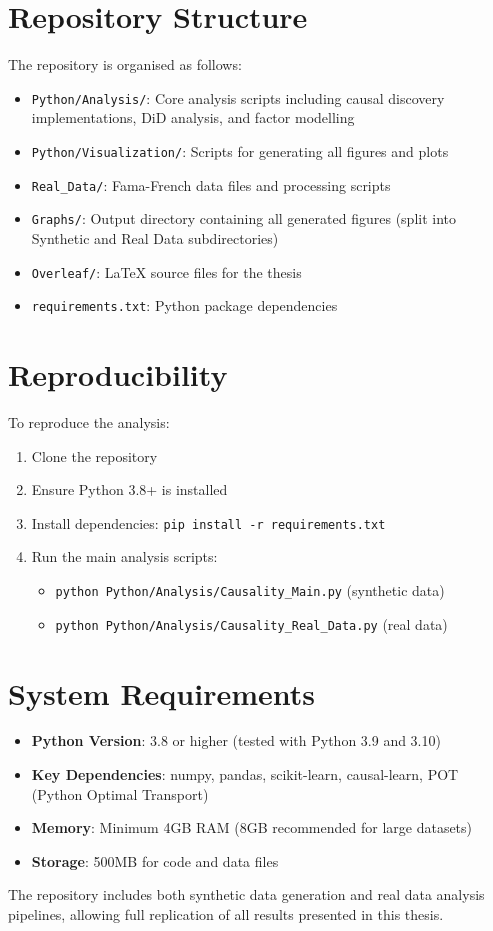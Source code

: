 \section*{Repository Structure}
The repository is organised as follows:
\begin{itemize}
    \item \texttt{Python/Analysis/}: Core analysis scripts including causal discovery implementations, DiD analysis, and factor modelling
    \item \texttt{Python/Visualization/}: Scripts for generating all figures and plots
    \item \texttt{Real\_Data/}: Fama-French data files and processing scripts
    \item \texttt{Graphs/}: Output directory containing all generated figures (split into Synthetic and Real Data subdirectories)
    \item \texttt{Overleaf/}: LaTeX source files for the thesis
    \item \texttt{requirements.txt}: Python package dependencies
\end{itemize}

\section*{Reproducibility}
To reproduce the analysis:
\begin{enumerate}
    \item Clone the repository
    \item Ensure Python 3.8+ is installed
    \item Install dependencies: \texttt{pip install -r requirements.txt}
    \item Run the main analysis scripts:
    \begin{itemize}
        \item \texttt{python Python/Analysis/Causality\_Main.py} (synthetic data)
        \item \texttt{python Python/Analysis/Causality\_Real\_Data.py} (real data)
    \end{itemize}
\end{enumerate}

\section*{System Requirements}
\begin{itemize}
    \item \textbf{Python Version}: 3.8 or higher (tested with Python 3.9 and 3.10)
    \item \textbf{Key Dependencies}: numpy, pandas, scikit-learn, causal-learn, POT (Python Optimal Transport)
    \item \textbf{Memory}: Minimum 4GB RAM (8GB recommended for large datasets)
    \item \textbf{Storage}: 500MB for code and data files
\end{itemize}

The repository includes both synthetic data generation and real data analysis pipelines, allowing full replication of all results presented in this thesis.